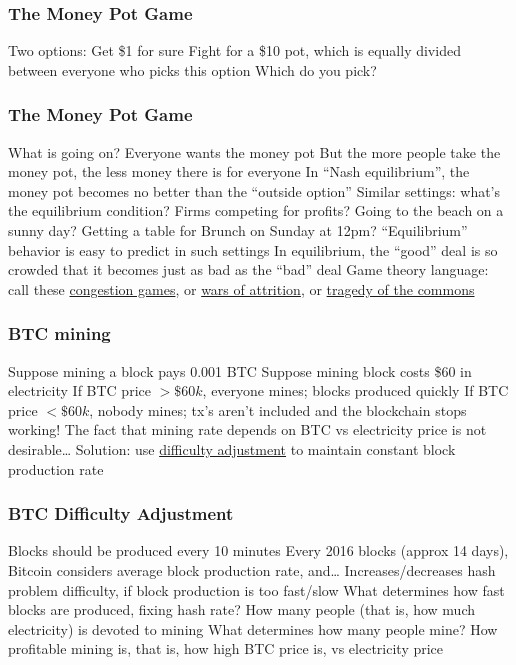 \documentclass[aspectratio=169]{beamer}
\begin{document}
\begin{frame}
\frametitle{The Money Pot Game}

\bi
\m Two options:
\be
\m Get \$1 for sure
\m Fight for a \$10 pot, which is equally divided between everyone who picks this option
\ee \pause
\m Which do you pick?
\ei

\end{frame}

\begin{frame}
\frametitle{The Money Pot Game}

\bi
\m What is going on?
\bi
\m Everyone wants the money pot
\m But the more people take the money pot, the less money there is for everyone
\m In ``Nash equilibrium'', the money pot becomes no better than the ``outside option''
\ei \pause
\m Similar settings: what's the equilibrium condition?
\bi
\m Firms competing for profits? \pause
\m Going to the beach on a sunny day? \pause
\m Getting a table for Brunch on Sunday at 12pm? \pause
\ei
\m ``Equilibrium'' behavior is easy to predict in such settings
\bi
\m In equilibrium, the ``good'' deal is so crowded that it becomes just as bad as the ``bad'' deal
\ei \pause
\m Game theory language: call these \ul{congestion games}, or \ul{wars of attrition}, or \ul{tragedy of the commons}
\ei

\end{frame}


\begin{frame}
\frametitle{BTC mining}

\bi
\m Suppose mining a block pays 0.001 BTC
\m Suppose mining block costs \$60 in electricity
\bi
\m If BTC price $>\$60k$, everyone mines; blocks produced quickly
\m If BTC price $<\$60k$, nobody mines; tx's aren't included and the blockchain stops working!
\ei
\m The fact that mining rate depends on BTC vs electricity price is not desirable\ldots
\m Solution: use \ul{difficulty adjustment} to maintain constant block production rate
\ei

\end{frame}

\begin{frame}
\frametitle{BTC Difficulty Adjustment}

\bi
\m Blocks should be produced every 10 minutes
\m Every 2016 blocks (approx 14 days), Bitcoin considers average block production rate, and\ldots
\bi
\m Increases/decreases hash problem difficulty, if block production is too fast/slow
\ei
\m What determines how fast blocks are produced, fixing hash rate? \pause
\bi
\m How many people (that is, how much electricity) is devoted to mining
\ei \pause
\m What determines how many people mine?
\bi
\m How profitable mining is, that is, how high BTC price is, vs electricity price
\ei
\ei

\end{frame}
\end{document}
